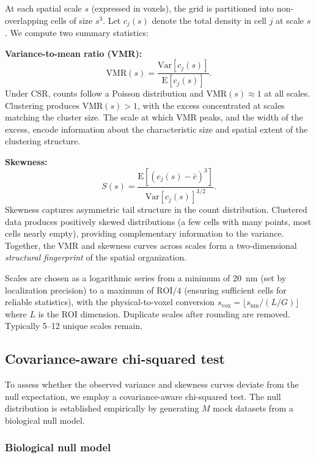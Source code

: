 \documentclass[11pt]{article}
\begin{document}
At each spatial scale $s$ (expressed in voxels), the grid is partitioned
into non-overlapping cells of size $s^3$. Let $c_j(s)$ denote the total
density in cell $j$ at scale $s$. We compute two summary statistics:

\textbf{Variance-to-mean ratio (VMR):}
\begin{equation}
  \mathrm{VMR}(s) = \frac{\mathrm{Var}[c_j(s)]}{\mathrm{E}[c_j(s)]}.
  \label{eq:vmr}
\end{equation}
Under CSR, counts follow a Poisson distribution and
$\mathrm{VMR}(s) \approx 1$ at all scales. Clustering produces
$\mathrm{VMR}(s) > 1$, with the excess concentrated at scales matching
the cluster size. The scale at which VMR peaks, and the width of the
excess, encode information about the characteristic size and spatial
extent of the clustering structure.

\textbf{Skewness:}
\begin{equation}
  S(s) = \frac{\mathrm{E}[(c_j(s) - \bar{c})^3]}
              {\mathrm{Var}[c_j(s)]^{3/2}}.
  \label{eq:skewness}
\end{equation}
Skewness captures asymmetric tail structure in the count distribution.
Clustered data produces positively skewed distributions (a few cells with
many points, most cells nearly empty), providing complementary information
to the variance. Together, the VMR and skewness curves across scales form
a two-dimensional \emph{structural fingerprint} of the spatial
organization.

Scales are chosen as a logarithmic series from a minimum of 20~nm (set by
localization precision) to a maximum of $\mathrm{ROI}/4$ (ensuring
sufficient cells for reliable statistics), with the physical-to-voxel
conversion $s_\mathrm{vox} = \lfloor s_\mathrm{nm} / (L / G) \rfloor$
where $L$ is the ROI dimension. Duplicate scales after rounding are
removed. Typically 5--12 unique scales remain.

\subsection{Covariance-aware chi-squared test}

To assess whether the observed variance and skewness curves deviate from
the null expectation, we employ a covariance-aware chi-squared test. The
null distribution is established empirically by generating $M$ mock
datasets from a biological null model.

\subsubsection{Biological null model}
\end{document}
